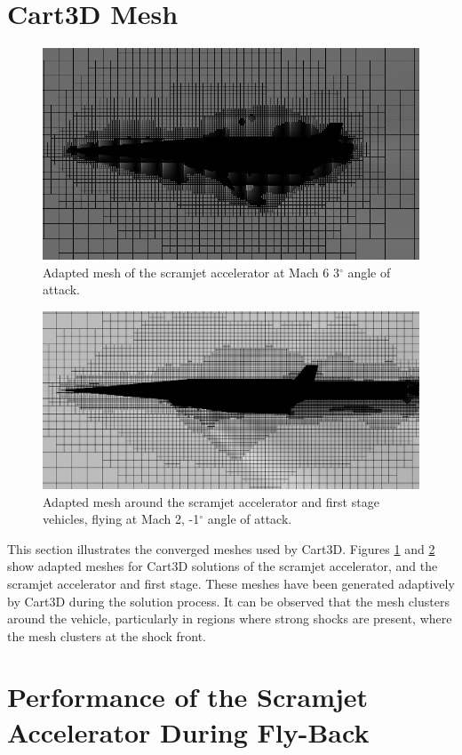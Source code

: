 \section{Cart3D Mesh}
\begin{figure}[ht]
	\centering
	\includegraphics[width=0.7\linewidth]{figures/3_vehicle_design/M3AoA6GRID}
	\caption{Adapted mesh of the scramjet accelerator at Mach 6 3$^\circ$ angle of attack.}
	\label{fig:M3AoA6GRID}
\end{figure}

\begin{figure}[ht]
	\centering
	\includegraphics[width=0.7\linewidth]{figures/3_vehicle_design/CARTmesh}
	\caption{Adapted mesh around the scramjet accelerator and first stage vehicles, flying at Mach 2, -1$^\circ$ angle of attack.}
	\label{fig:CARTmesh}
\end{figure}
This section illustrates the converged meshes used by Cart3D.
Figures \ref{fig:M3AoA6GRID} and \ref{fig:CARTmesh} show adapted meshes for Cart3D solutions of the scramjet accelerator, and the scramjet accelerator and first stage. These meshes have been generated adaptively by Cart3D during the solution process. It can be observed that the mesh clusters around the vehicle, particularly in regions where strong shocks are present, where the mesh clusters at the shock front. 



\FloatBarrier
\section{Performance of the Scramjet Accelerator During Fly-Back}

